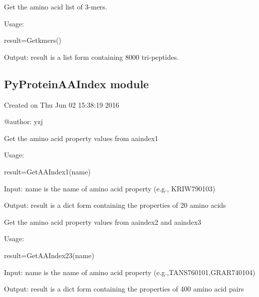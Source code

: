 \documentclass[letterpaper,10pt,english]{sphinxmanual}
\begin{document}

\begin{fulllineitems}
\label{reference/PyProteinAAComposition:PyProteinAAComposition.Getkmers}
Get the amino acid list of 3-mers.

Usage:

result=Getkmers()

Output: result is a list form containing 8000 tri-peptides.

\end{fulllineitems}



\subsection{PyProteinAAIndex module}
\label{reference/PyProteinAAIndex::doc}\label{reference/PyProteinAAIndex:pyproteinaaindex-module}\label{reference/PyProteinAAIndex:module-PyProteinAAIndex}
Created on Thu Jun 02 15:38:19 2016

@author: yzj

\begin{fulllineitems}
\label{reference/PyProteinAAIndex:PyProteinAAIndex.GetAAIndex1}
Get the amino acid property values from aaindex1

Usage:

result=GetAAIndex1(name)

Input: name is the name of amino acid property (e.g., KRIW790103)

Output: result is a dict form containing the properties of 20 amino acids

\end{fulllineitems}


\begin{fulllineitems}
\label{reference/PyProteinAAIndex:PyProteinAAIndex.GetAAIndex23}
Get the amino acid property values from aaindex2 and aaindex3

Usage:

result=GetAAIndex23(name)

Input: name is the name of amino acid property (e.g.,TANS760101,GRAR740104)

Output: result is a dict form containing the properties of 400 amino acid pairs

\end{fulllineitems}
\end{document}
